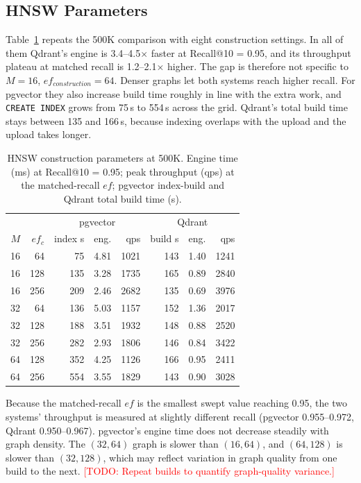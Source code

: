 \documentclass[sigconf, nonacm]{acmart}
\newcommand{\todo}[1]{\textcolor{red}{[TODO: #1]}}
\newcommand{\todo}[1]{\errmessage{Unresolved TODO: #1}}
\begin{document}
\subsection{HNSW Parameters}

Table~\ref{tab:hnsw} repeats the 500K comparison with eight construction settings. In
all of them Qdrant's engine is 3.4--4.5$\times$ faster at Recall@10 = 0.95, and its
throughput plateau at matched recall is 1.2--2.1$\times$ higher. The gap is therefore not
specific to $M=16$, $ef_{construction}=64$. Denser graphs let both systems reach higher
recall. For pgvector they also increase build time roughly in line with the extra work,
and \texttt{CREATE INDEX} grows from 75\,s to 554\,s across the grid. Qdrant's total build
time stays between 135 and 166\,s, because indexing overlaps with the upload and the
upload takes longer.

\begin{table}[h]
  \caption{HNSW construction parameters at 500K. Engine time (ms) at Recall@10 = 0.95;
  peak throughput (qps) at the matched-recall $ef$; pgvector index-build and Qdrant total
  build time (s).}
  \label{tab:hnsw}
  \small
  \begin{tabular}{rr|rrr|rrr}
    \toprule
     & & \multicolumn{3}{c|}{pgvector} & \multicolumn{3}{c}{Qdrant} \\
    $M$ & $ef_c$ & index s & eng. & qps & build s & eng. & qps \\
    \midrule
    16 & 64 & 75 & 4.81 & 1021 & 143 & 1.40 & 1241 \\
    16 & 128 & 135 & 3.28 & 1735 & 165 & 0.89 & 2840 \\
    16 & 256 & 209 & 2.46 & 2682 & 135 & 0.69 & 3976 \\
    32 & 64 & 136 & 5.03 & 1157 & 152 & 1.36 & 2017 \\
    32 & 128 & 188 & 3.51 & 1932 & 148 & 0.88 & 2520 \\
    32 & 256 & 282 & 2.93 & 1806 & 146 & 0.84 & 3422 \\
    64 & 128 & 352 & 4.25 & 1126 & 166 & 0.95 & 2411 \\
    64 & 256 & 554 & 3.55 & 1829 & 143 & 0.90 & 3028 \\
    \bottomrule
  \end{tabular}
\end{table}

Because the matched-recall $ef$ is the smallest swept value reaching 0.95, the two
systems' throughput is measured at slightly different recall (pgvector 0.955--0.972,
Qdrant 0.950--0.967). pgvector's engine time does not decrease steadily with graph
density. The $(32,64)$ graph is slower than $(16,64)$, and $(64,128)$ is slower than
$(32,128)$, which may reflect variation in graph quality from one build to the next.
\todo{Repeat builds to quantify graph-quality variance.}
\end{document}
